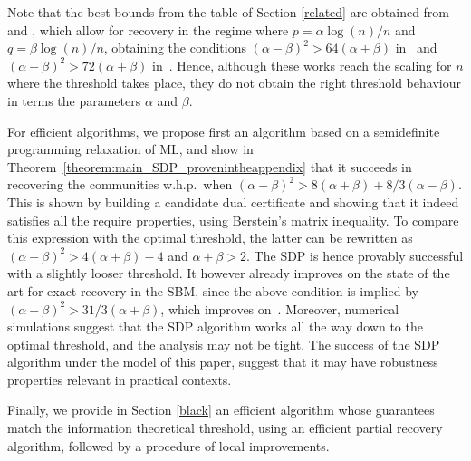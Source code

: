 \documentclass[english]{article}
\newcommand{\1}{\textbf{1}}
\begin{document}
Note that the best bounds from the table of Section \ref{related} are obtained from \cite{boppana} and \cite{mcsherry}, which allow for recovery in the regime where $p=\alpha \log(n)/n$ and $q=\beta \log(n)/n$, obtaining the conditions $(\alpha-\beta)^2 > 64(\alpha+\beta)$ in~\cite{mcsherry} and $(\alpha-\beta)^2 > 72(\alpha+\beta)$ in~\cite{boppana}.  Hence, although these works reach the scaling for $n$ where the threshold takes place, they do not obtain the right threshold behaviour in terms the parameters $\alpha$ and $\beta$.  


For efficient algorithms, we propose first an algorithm based on a semidefinite programming relaxation of ML, and show in Theorem~\ref{theorem:main_SDP_provenintheappendix} that it succeeds in recovering the communities w.h.p.\ when $(\alpha - \beta)^2 > 8(\alpha + \beta)+ 8/3(\alpha - \beta)$. This is shown by building a candidate dual certificate and showing that it indeed satisfies all the require properties, using Berstein's matrix inequality.
To compare this expression with the optimal threshold, the latter can be rewritten as $(\alpha - \beta)^2 > 4(\alpha + \beta) - 4$ and $\alpha + \beta >2$. 
The SDP is hence provably successful with a slightly looser threshold. It however already improves on the state of the art for exact recovery in the SBM, since the above condition is implied by $(\alpha-\beta)^2 > 31/3(\alpha+\beta)$, which improves on~\cite{mcsherry}. 
Moreover, numerical simulations suggest that the SDP algorithm works all the way down to the optimal threshold, and the analysis may not be tight. The success of the SDP algorithm under the model of this paper, suggest that it may have robustness properties relevant in practical contexts.     

Finally, we provide in Section \ref{black} an efficient algorithm whose guarantees match the information theoretical threshold, using an efficient partial recovery algorithm, followed by a procedure of local improvements. %
\end{document}
